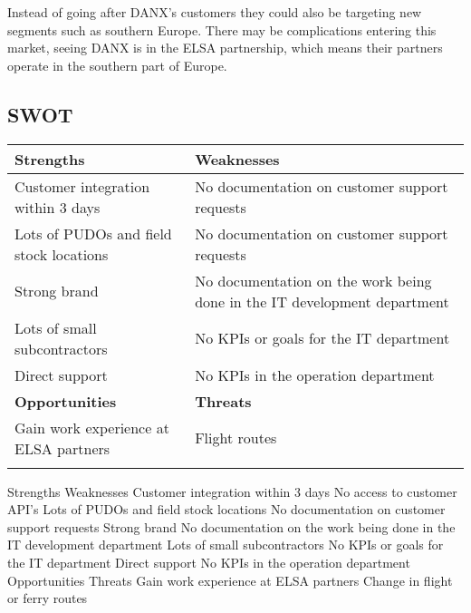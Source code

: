 Instead of going after DANX’s customers they could also be targeting new segments such as southern Europe. There may be complications entering this market, seeing DANX is in the ELSA partnership, which means their partners operate in the southern part of Europe.

\subsection{SWOT}

\begin{tabular}{ | p{6.4cm} | p{6.4cm} | }
\hline
\textbf{Strengths} & \textbf{Weaknesses} \\ \hline
Customer integration within 3 days & No documentation on customer support requests \\ \hline
Lots of PUDOs and field stock locations & No documentation on customer support requests \\ \hline
Strong brand & No documentation on the work being done in the IT development department \\ \hline
Lots of small subcontractors & No KPIs or goals for the IT department \\ \hline
Direct support & No KPIs in the operation department \\ \hline
\textbf{Opportunities} & \textbf{Threats} \\ \hline
Gain work experience at ELSA partners & Flight routes \\ \hline
 & \\
	\hline
\end{tabular}
Strengths
Weaknesses
Customer integration within 3 days
No access to customer API’s
Lots of PUDOs and field stock locations
No documentation on customer support requests
Strong brand
No documentation on the work being done in the IT development department 
Lots of small subcontractors
No KPIs or goals for the IT department
Direct support
No KPIs in the operation department
Opportunities
Threats
Gain work experience at ELSA partners
Change in flight or ferry routes





